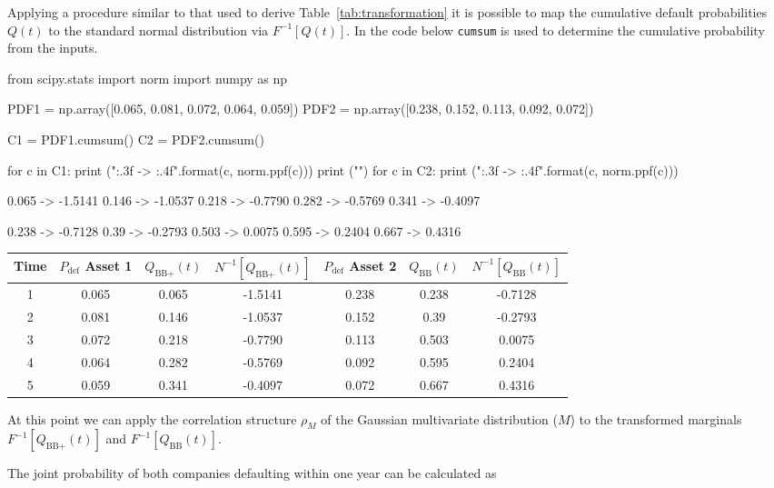 Applying a procedure similar to that used to derive Table~\ref{tab:transformation} it is possible to map the cumulative default probabilities $Q(t)$ to the standard normal distribution via $F^{-1}[Q(t)]$.
In the code below \texttt{cumsum} is used to determine the cumulative probability from the inputs.

\begin{ipython}
from scipy.stats import norm
import numpy as np

PDF1 = np.array([0.065, 0.081, 0.072, 0.064, 0.059])
PDF2 = np.array([0.238, 0.152, 0.113, 0.092, 0.072])

C1 = PDF1.cumsum()
C2 = PDF2.cumsum()

for c in C1:
    print ("{:.3f} -> {:.4f}".format(c, norm.ppf(c)))
print ("")
for c in C2:
    print ("{:.3f} -> {:.4f}".format(c, norm.ppf(c)))
\end{ipython}
\begin{ioutput}
0.065 -> -1.5141
0.146 -> -1.0537
0.218 -> -0.7790
0.282 -> -0.5769
0.341 -> -0.4097

0.238 -> -0.7128
0.39 -> -0.2793
0.503 -> 0.0075
0.595 -> 0.2404
0.667 -> 0.4316
\end{ioutput}

\begin{table}[htbp]
\centering
\begin{tabular}{|c|c|c|c|c|c|c|}
\hline
Time & $P_{\mathrm{def}}$ Asset 1 & $Q_{\textrm{BB+}}(t)$ & $N^{-1}[Q_{\textrm{BB+}}(t)]$ & $P_{\mathrm{def}}$ Asset 2 & $Q_{\textrm{BB}}(t)$ & $N^{-1}[Q_{\textrm{BB}}(t)]$\\
\hline
\hline
1 & 0.065 & 0.065 & -1.5141 & 0.238 & 0.238 & -0.7128\\
2 & 0.081 & 0.146 & -1.0537 & 0.152 & 0.39 & -0.2793\\
3 & 0.072 & 0.218 & -0.7790 & 0.113 & 0.503 & 0.0075\\
4 & 0.064 & 0.282 & -0.5769 & 0.092 & 0.595 & 0.2404\\
5 & 0.059 & 0.341 & -0.4097 & 0.072 & 0.667 & 0.4316\\
\hline
\end{tabular}
\end{table}

At this point we can apply the correlation structure $\rho_M$ of the Gaussian multivariate distribution ($M$) to the transformed marginals $F^{-1}[Q_{\textrm{BB+}}(t)]$ and $F^{-1}[Q_{\textrm{BB}}(t)]$.

The joint probability of both companies defaulting within one year can be calculated as


